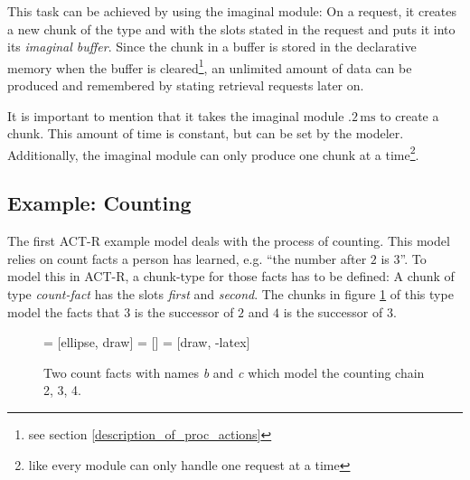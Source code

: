This task can be achieved by using the imaginal module: On a request, it creates a new chunk of the type and with the slots stated in the request and puts it into its \emph{imaginal buffer}. Since the chunk in a buffer is stored in the declarative memory when the buffer is cleared\footnote{see section \ref{description_of_proc_actions}}, an unlimited amount of data can be produced and remembered by stating retrieval requests later on.

It is important to mention that it takes the imaginal module $.2\,\mathrm{ms}$ to create a chunk. This amount of time is constant, but can be set by the modeler. Additionally, the imaginal module can only produce one chunk at a time\footnote{like every module can only handle one request at a time}.

\subsection{Example: Counting}
\label{example_counting}

The first ACT-R example model deals with the process of counting. This model relies on count facts a person has learned, e.g. ``the number after $2$ is $3$''. To model this in ACT-R, a chunk-type for those facts has to be defined: A chunk of type \emph{count-fact} has the slots \emph{first} and \emph{second}. The chunks in figure \ref{fig:example_counting_chunks} of this type model the facts that $3$ is the successor of $2$ and $4$ is the successor of $3$.

\begin{figure}[htb]
\centering
{} = [ellipse, draw]
 = [] 
 = [draw, -latex]   

\caption{Two count facts with names \emph{b} and \emph{c} which model the counting chain 2, 3, 4.}
\label{fig:example_counting_chunks}
\end{figure}


